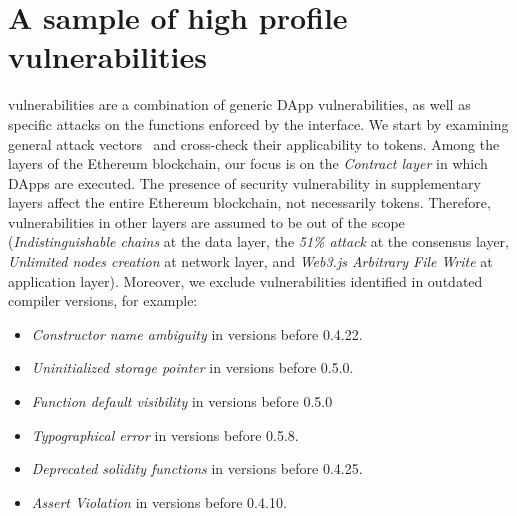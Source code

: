 

\section{A sample of high profile vulnerabilities}\label{sec:vul}
\erc vulnerabilities are a combination of generic DApp vulnerabilities, as well as specific attacks on the functions enforced by the \erc interface. We start by examining general attack vectors~\cite{SolidtySecBlog,EthSecServ,SoliditySecCon,ConsensysSecCon,LandoKL} and cross-check their applicability to \erc tokens. Among the layers of the Ethereum blockchain, our focus is on the \textit{Contract layer} in which DApps are executed. The presence of security vulnerability in supplementary layers affect the entire Ethereum blockchain, not necessarily \erc tokens. Therefore, vulnerabilities in other layers are assumed to be out of the scope (\eg \textit{Indistinguishable chains} at the data layer, the \textit{51\% attack} at the consensus layer, \textit{Unlimited nodes creation} at network layer, and \textit{Web3.js Arbitrary File Write} at application layer). Moreover, we exclude vulnerabilities identified in outdated compiler versions, for example:

\begin{itemize}
	\item \textit{Constructor name ambiguity} in versions before 0.4.22.
	\item \textit{Uninitialized storage pointer} in versions before 0.5.0.
	\item \textit{Function default visibility} in versions before 0.5.0
	\item \textit{Typographical error} in versions before 0.5.8.
	\item \textit{Deprecated solidity functions} in versions before 0.4.25.
	\item \textit{Assert Violation} in versions before 0.4.10.
\end{itemize}


